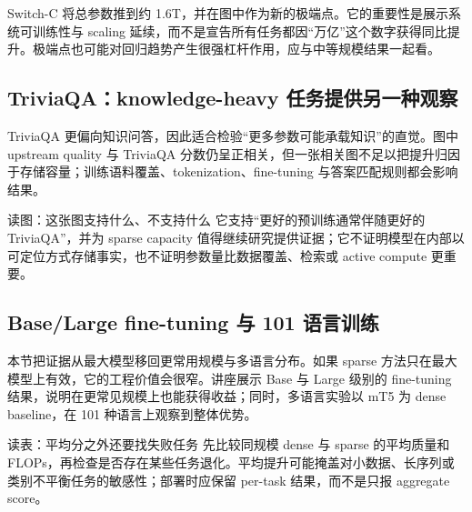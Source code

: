 Switch-C 将总参数推到约 1.6T，并在图中作为新的极端点。它的重要性是展示系统可训练性与 scaling 延续，而不是宣告所有任务都因“万亿”这个数字获得同比提升。极端点也可能对回归趋势产生很强杠杆作用，应与中等规模结果一起看。



\subsection{TriviaQA：knowledge-heavy 任务提供另一种观察}

TriviaQA 更偏向知识问答，因此适合检验“更多参数可能承载知识”的直觉。图中 upstream quality 与 TriviaQA 分数仍呈正相关，但一张相关图不足以把提升归因于存储容量；训练语料覆盖、tokenization、fine-tuning 与答案匹配规则都会影响结果。


\begin{knowledgebox}{读图：这张图支持什么、不支持什么}
它支持“更好的预训练通常伴随更好的 TriviaQA”，并为 sparse capacity 值得继续研究提供证据；它不证明模型在内部以可定位方式存储事实，也不证明参数量比数据覆盖、检索或 active compute 更重要。
\end{knowledgebox}

\subsection{Base/Large fine-tuning 与 101 语言训练}

本节把证据从最大模型移回更常用规模与多语言分布。如果 sparse 方法只在最大模型上有效，它的工程价值会很窄。讲座展示 Base 与 Large 级别的 fine-tuning 结果，说明在更常见规模上也能获得收益；同时，多语言实验以 mT5 为 dense baseline，在 101 种语言上观察到整体优势。


\begin{knowledgebox}{读表：平均分之外还要找失败任务}
先比较同规模 dense 与 sparse 的平均质量和 FLOPs，再检查是否存在某些任务退化。平均提升可能掩盖对小数据、长序列或类别不平衡任务的敏感性；部署时应保留 per-task 结果，而不是只报 aggregate score。
\end{knowledgebox}

